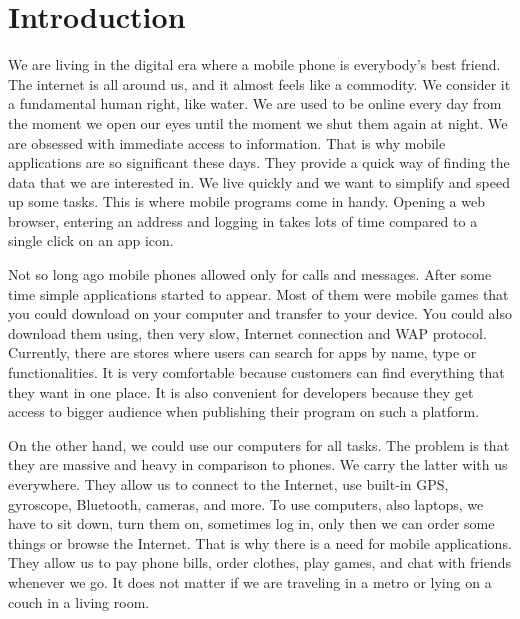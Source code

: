 \chapter{Introduction}

We are living in the digital era where a mobile phone is everybody's best friend. The internet is all around us, and it almost feels like a commodity. We consider it a fundamental human right, like water. We are used to be online every day from the moment we open our eyes until the moment we shut them again at night. We are obsessed with immediate access to information. That is why mobile applications are so significant these days. They provide a quick way of finding the data that we are interested in. We live quickly and we want to simplify and speed up some tasks. This is where mobile programs come in handy. Opening a web browser, entering an address and logging in takes lots of time compared to a single click on an app icon.

Not so long ago mobile phones allowed only for calls and messages. After some time simple applications started to appear. Most of them were mobile games that you could download on your computer and transfer to your device. You could also download them using, then very slow, Internet connection and WAP protocol. Currently, there are stores where users can search for apps by name, type or functionalities. It is very comfortable because customers can find everything that they want in one place. It is also convenient for developers because they get access to bigger audience when publishing their program on such a platform.

On the other hand, we could use our computers for all tasks. The problem is that they are massive and heavy in comparison to phones. We carry the latter with us everywhere. They allow us to connect to the Internet, use built-in GPS, gyroscope, Bluetooth, cameras, and more. To use computers, also laptops, we have to sit down, turn them on, sometimes log in, only then we can order some things or browse the Internet. That is why there is a need for mobile applications. They allow us to pay phone bills, order clothes, play games, and chat with friends whenever we go. It does not matter if we are traveling in a metro or lying on a couch in a living room.


